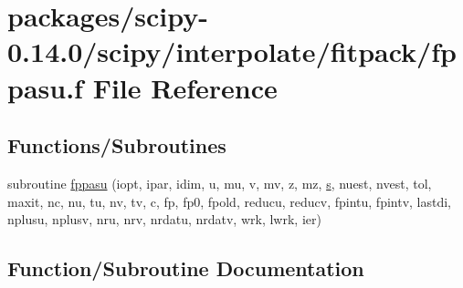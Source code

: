 \hypertarget{fppasu_8f}{}\section{packages/scipy-\/0.14.0/scipy/interpolate/fitpack/fppasu.f File Reference}
\label{fppasu_8f}
\subsection*{Functions/\+Subroutines}
\begin{DoxyCompactItemize}
\item 
subroutine \hyperlink{fppasu_8f_a7e01284e8fe6e45eb30672582e8b0bc2}{fppasu} (iopt, ipar, idim, u, mu, v, mv, z, mz, \hyperlink{indexexpr_8h_ae024b0db549122b44c349ae28ec990dc}{s}, nuest, nvest, tol, maxit, nc, nu, tu, nv, tv, c, fp, fp0, fpold, reducu, reducv, fpintu, fpintv, lastdi, nplusu, nplusv, nru, nrv, nrdatu, nrdatv, wrk, lwrk, ier)
\end{DoxyCompactItemize}


\subsection{Function/\+Subroutine Documentation}
\hypertarget{fppasu_8f_a7e01284e8fe6e45eb30672582e8b0bc2}{}
